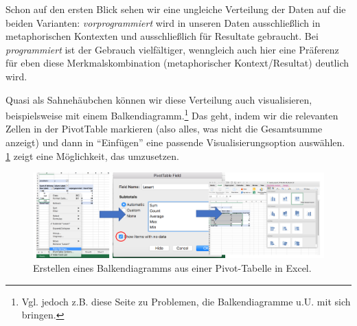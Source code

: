 \documentclass[]{article}
\let\rmarkdownfootnote\footnote%
\def\footnote{\protect\rmarkdownfootnote}
\begin{document}
Schon auf den ersten Blick sehen wir eine ungleiche Verteilung der Daten
auf die beiden Varianten: \emph{vorprogrammiert} wird in unseren Daten
ausschließlich in metaphorischen Kontexten und ausschließlich für
Resultate gebraucht. Bei \emph{programmiert} ist der Gebrauch
vielfältiger, wenngleich auch hier eine Präferenz für eben diese
Merkmalskombination (metaphorischer Kontext/Resultat) deutlich wird.

Quasi als Sahnehäubchen können wir diese Verteilung auch visualisieren,
beispielsweise mit einem Balkendiagramm.\footnote{Vgl. jedoch z.B. diese
  Seite zu Problemen, die Balkendiagramme u.U. mit sich bringen.} Das
geht, indem wir die relevanten Zellen in der PivotTable markieren (also
alles, was nicht die Gesamtsumme anzeigt) und dann in ``Einfügen'' eine
passende Visualisierungsoption auswählen. \ref{fig:excelvisualize} zeigt
eine Möglichkeit, das umzusetzen.

\begin{figure}
\includegraphics[width=6.66in]{fig/excel_visualize} \caption{Erstellen eines Balkendiagramms aus einer Pivot-Tabelle in Excel.}\label{fig:excelvisualize}
\end{figure}
\end{document}
